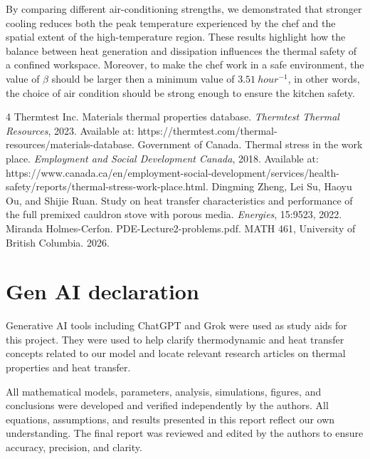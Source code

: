 \documentclass{article}
\begin{document}
\noindent By comparing different air-conditioning strengths, we demonstrated that stronger cooling reduces both the peak temperature experienced by the chef and the spatial extent of the high-temperature region. These results highlight how the balance between heat generation and dissipation influences the thermal safety of a confined workspace. Moreover, to make the chef work in a safe environment, the value of $\beta$ should be larger then a minimum value of $3.51 \ hour^{-1}$, in other words, the choice of air condition should be strong enough to ensure the  kitchen safety.

\begin{thebibliography}{4} %
Thermtest Inc. 
Materials thermal properties database. \emph{Thermtest Thermal Resources}, 2023. Available at: https://thermtest.com/thermal-resources/materials-database.
Government of Canada.
Thermal stress in the work place.  \emph{Employment and Social Development Canada}, 2018. Available at: https://www.canada.ca/en/employment-social-development/services/health-safety/reports/thermal-stress-work-place.html.
Dingming Zheng, Lei Su, Haoyu Ou, and Shijie Ruan.
Study on heat transfer characteristics and performance of the full premixed cauldron stove with porous media. \emph{Energies}, 15:9523, 2022.
Miranda Holmes-Cerfon. PDE-Lecture2-problems.pdf. MATH 461, University of British Columbia. 2026.
\end{thebibliography}

\newpage

\section*{Gen AI declaration} 
Generative AI tools including ChatGPT and Grok were used as study aids for this project. They were used to help clarify thermodynamic and heat transfer concepts related to our model and locate relevant research articles on thermal properties and heat transfer.

\vspace{5mm}

\noindent All mathematical models, parameters, analysis, simulations, figures, and conclusions were developed and verified independently by the authors. All equations, assumptions, and results presented in this report reflect our own understanding. The final report was reviewed and edited by the authors to ensure accuracy, precision, and clarity.
\end{document}
